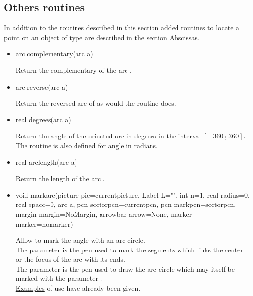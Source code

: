 \documentclass[pdftex]{article}
\begin{document}
\subsection{Others routines}
In addition to the routines described in this section added routines
to locate a point on an object of type  are described
in the section \href{#section.abscissa}{Abscissas}.
\begin{itemize}
\item {}
  \begin{Vcolor}
    arc complementary(arc a)
  \end{Vcolor}
  Return the complementary of the arc .
\item {}
  \begin{Vcolor}
    arc reverse(arc a)
  \end{Vcolor}
  Return the reversed arc of  as would the routine
   does.
\item {}
  \begin{Vcolor}
    real degrees(arc a)
  \end{Vcolor}
  Return the angle of the oriented arc  in degrees in the
  interval $\left[-360\,;\,360\right]$.\\
  The routine  is also defined for angle in radians.
\item {}
  \begin{Vcolor}
    real arclength(arc a)
  \end{Vcolor}
  Return the length of the arc .
\item {}
  \begin{Vcolor}
    void markarc(picture pic=currentpicture,
    Label L="", int n=1, real radius=0, real space=0,
    arc a, pen sectorpen=currentpen, pen markpen=sectorpen,
    margin margin=NoMargin, arrowbar arrow=None, marker marker=nomarker)
  \end{Vcolor}
  Allow to mark the angle  with an arc circle.\\
  The parameter  is the pen used to mark the segments
  which links the center or the focus of the arc with its ends.\\
  The parameter  is the pen used to draw the arc circle
  which may itself be marked with the parameter .\\
  \href{#markarc}{Examples} of use have already been given.

\end{itemize}
\end{document}
